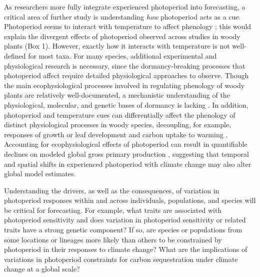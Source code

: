 \documentclass{article}
\begin{document}
\par As researchers more fully integrate experienced photoperiod into forecasting, a critical area of further study is understanding \emph{how} photoperiod acts as a cue. Photoperiod seems to interact with temperature to affect phenology \citep[e.g.,][]{zydlewski2014}; this would explain the divergent effects of photoperiod observed across studies in woody plants (Box 1). However, exactly how it interacts with temperature is not well-defined for most taxa. For many species, additional experimental and physiological research is necessary, since the dormancy-breaking processes that photoperiod affect require detailed physiological approaches to observe. Though the main ecophysiological processes involved in regulating phenology of woody plants are relatively well-documented, a  mechanistic understanding of the physiological, molecular, and genetic bases of dormancy is lacking \citep[Box 2][]{hanninen2019, chuine2016}. In addition, photoperiod and temperature cues can differentially affect the phenology of distinct physiological processes in woody species, decoupling, for example, responses of growth or leaf development and carbon uptake to warming \citep{stinziano2017,bauerle2012}. Accounting for ecophysiological effects of photoperiod can result in quantifiable declines on modeled global gross primary production \citep{bauerle2012}, suggesting that temporal and spatial shifts in experienced photoperiod with climate change may also alter global model estimates.
\par Understanding the drivers, as well as the consequences, of variation in photoperiod responses within and across individuals, populations, and species will be critical for forecasting.  For example, what traits are associated with photoperiod sensitivity and does variation in photoperiod sensitivity or related traits have a strong genetic component? If so, are species or populations from some locations or lineages more likely than others to be constrained by photoperiod in their responses to climate change? What are the implications of variations in photoperiod constraints for carbon sequestration under climate change at a global scale?
\end{document}
